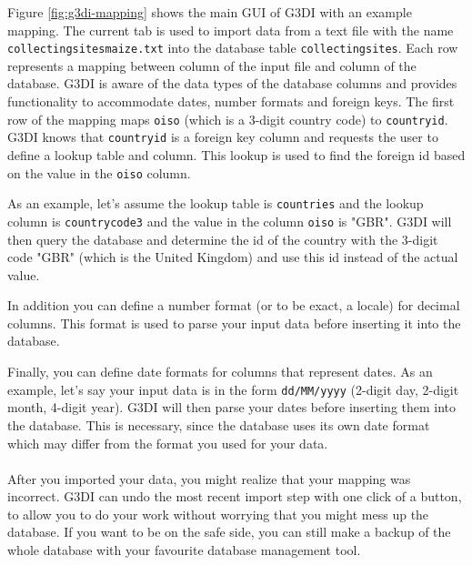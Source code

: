 \noindent Figure \ref{fig:g3di-mapping} shows the main GUI of G3DI with an example mapping. The current tab is used to import data from a text file with the name \texttt{collectingsites\textunderscore maize.txt} into the database table \texttt{collectingsites}. Each row represents a mapping between column of the input file and column of the database. G3DI is aware of the data types of the database columns and provides functionality to accommodate dates, number formats and foreign keys. The first row of the mapping maps \texttt{oiso} (which is a 3-digit country code) to \texttt{country\textunderscore id}. G3DI knows that \texttt{country\textunderscore id} is a foreign key column and requests the user to define a lookup table and column. This lookup is used to find the foreign id based on the value in the \texttt{oiso} column.

As an example, let's assume the lookup table is \texttt{countries} and the lookup column is \texttt{country\textunderscore code3} and the value in the column \texttt{oiso} is "GBR". G3DI will then query the database and determine the id of the country with the 3-digit code "GBR" (which is the United Kingdom) and use this id instead of the actual value.

In addition you can define a number format (or to be exact, a locale) for decimal columns. This format is used to parse your input data before inserting it into the database.

Finally, you can define date formats for columns that represent dates. As an example, let's say your input data is in the form \texttt{dd/MM/yyyy} (2-digit day, 2-digit month, 4-digit year). G3DI will then parse your dates before inserting them into the database. This is necessary, since the database uses its own date format which may differ from the format you used for your data.\\
\\
After you imported your data, you might realize that your mapping was incorrect. G3DI can undo the most recent import step with one click of a button, to allow you to do your work without worrying that you might mess up the database. If you want to be on the safe side, you can still make a backup of the whole database with your favourite database management tool.
